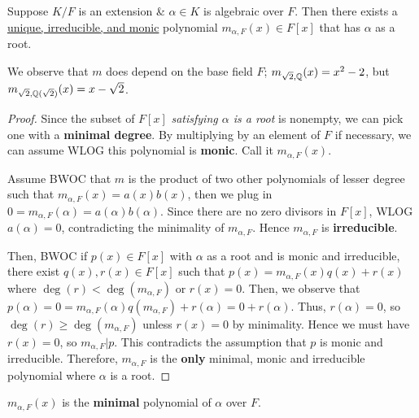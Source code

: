 \documentclass[12pt]{article}
\begin{document}
    \begin{proposition}
        Suppose $K/F$ is an extension \& $\alpha\in K$ is algebraic over $F$. Then there exists a \uline{unique, irreducible, and monic} polynomial $m_{\alpha,F}(x)\in F[x]$ that has $\alpha$ as a root.
    \end{proposition}
    \rmk We observe that $m$ does depend on the base field $F$; $m_{\sqrt{2},\mathbb{Q}}(x)=x^2-2$, but $m_{\sqrt{2},\mathbb{Q}(\sqrt{2})}(x)=x-\sqrt{2}$.
    \begin{proof}
        Since the subset of $F[x]$ \textit{satisfying $\alpha$ is a root} is nonempty, we can pick one with a \textbf{minimal degree}. By multiplying by an element of $F$ if necessary, we can assume WLOG this polynomial is \textbf{monic}. Call it $m_{\alpha,F}(x)$. 
        
        Assume BWOC that $m$ is the product of two other polynomials of lesser degree such that $m_{\alpha,F}(x)=a(x)b(x)$, then we plug in $0=m_{\alpha,F}(\alpha)=a(\alpha)b(\alpha)$. Since there are no zero divisors in $F[x]$, WLOG $a(\alpha)=0$, contradicting the minimality of $m_{\alpha,F}$. Hence $m_{\alpha,F}$ is \textbf{irreducible}.

        Then, BWOC if $p(x)\in F[x]$ with $\alpha$ as a root and is monic and irreducible, there exist $q(x),r(x)\in F[x]$ such that $p(x)=m_{\alpha,F}(x)q(x)+r(x)$ where $\deg(r)< \deg(m_{\alpha,F})$ or $r(x)=0$. Then, we observe that $p(\alpha)=0=m_{\alpha,F}(\alpha)q(m_{\alpha,F})+r(\alpha)=0+r(\alpha)$. Thus, $r(\alpha)=0$, so $\deg(r)\geq \deg(m_{\alpha,F})$ unless $r(x)=0$ by minimality. Hence we must have $r(x)=0$, so $m_{\alpha,F}|p$. This contradicts the assumption that $p$ is monic and irreducible.
        Therefore, $m_{\alpha,F}$ is the \textbf{only} minimal, monic and irreducible polynomial where $\alpha$ is a root.
    \end{proof}

     $m_{\alpha, F}(x)$ is the \textbf{minimal} polynomial of $\alpha$ over $F$.

\end{document}
